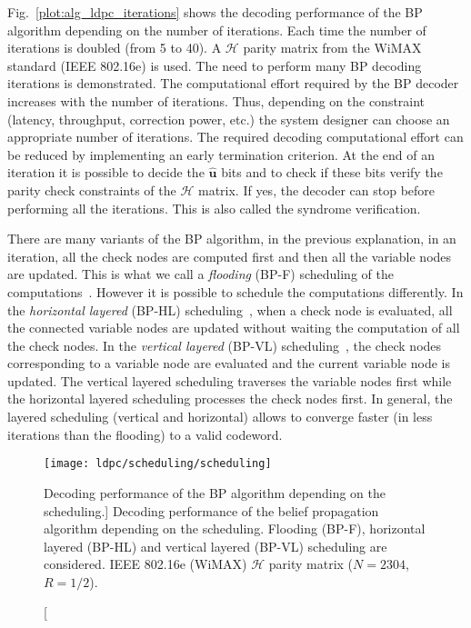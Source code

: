 Fig.~\ref{plot:alg_ldpc_iterations} shows the decoding performance of the BP
algorithm depending on the number of iterations. Each time the number of
iterations is doubled (from 5 to 40). A $\mathcal{H}$ parity matrix from the
WiMAX standard (IEEE 802.16e) is used. The need to perform many BP decoding
iterations is demonstrated. The computational effort required by the BP decoder
increases with the number of iterations. Thus, depending on the constraint
(latency, throughput, correction power, etc.) the system designer can choose an
appropriate number of iterations. The required decoding computational effort can
be reduced by implementing an early termination criterion. At the end of an
iteration it is possible to decide the $\bm{\hat{u}}$ bits and to check if these
bits verify the parity check constraints of the $\bm{\mathcal{H}}$ matrix. If
yes, the decoder can stop before performing all the iterations. This is also
called the syndrome verification.

There are many variants of the BP algorithm, in the previous explanation, in an
iteration, all the check nodes are computed first and then all the variable
nodes are updated. This is what we call a \emph{flooding} (BP-F) scheduling of
the computations~\cite{MacKay1995}. However it is possible to schedule the
computations differently. In the \emph{horizontal layered} (BP-HL)
scheduling~\cite{Yeo2001}, when a check node is evaluated, all the connected
variable nodes are updated without waiting the computation of all the check
nodes. In the \emph{vertical layered} (BP-VL) scheduling~\cite{Zhang2002}, the
check nodes corresponding to a variable node are evaluated and the current
variable node is updated. The vertical layered scheduling traverses the variable
nodes first while the horizontal layered scheduling processes the check nodes
first. In general, the layered scheduling (vertical and horizontal) allows to
converge faster (in less iterations than the flooding) to a valid codeword.

\begin{figure}[htp]
  \centering
  \texttt{[image: ldpc/scheduling/scheduling]}
  \caption
    [Decoding performance of the BP algorithm depending on the scheduling.]
    {Decoding performance of the belief propagation algorithm depending on the
     scheduling. Flooding (BP-F), horizontal layered (BP-HL) and vertical
     layered (BP-VL) scheduling are considered. IEEE 802.16e (WiMAX)
     $\mathcal{H}$ parity matrix ($N=2304$, $R=1/2$).}
  \label{plot:alg_ldpc_scheduling}
\end{figure}

